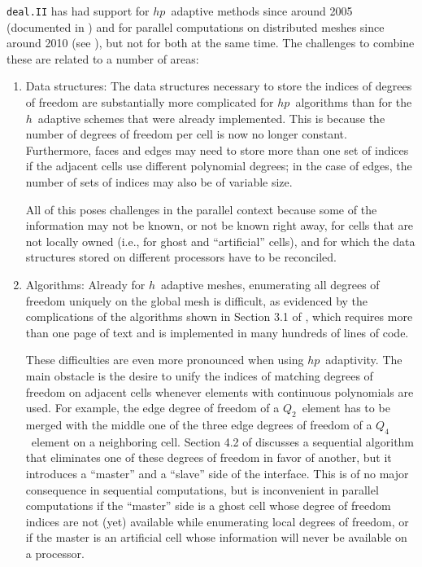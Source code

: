 \documentclass{ansarticle-preprint}
\newcommand{\specialword}[1]{\texttt{#1}}
\newcommand{\dealii}{{\specialword{deal.II}}\xspace}
\begin{document}
\dealii{} has had support for $hp$~adaptive methods since around 2005
(documented in \cite{BangerthKayserHerold2007}) and for parallel
computations on distributed meshes since around 2010 (see
\cite{BangerthBursteddeHeisterKronbichler11}), but not for both at the
same time. The challenges to combine these are related to a number of
areas:
\begin{enumerate}
\item Data structures: The data structures necessary to store the
  indices of degrees of freedom are substantially more
  complicated for $hp$~algorithms than for the $h$~adaptive schemes
  that were already implemented. This is because the number of degrees
  of freedom per cell is now no longer constant. Furthermore,
  faces and edges may need to store more than one set of indices if
  the adjacent cells use different polynomial degrees; in the case of
  edges, the number of sets of indices may also be of variable size.

  All of this poses challenges in the parallel context because some of
  the information may not be known, or not be known right away, for
  cells that are not locally owned (i.e., for ghost and ``artificial''
  cells), and for which the data structures stored on different
  processors have to be reconciled.

\item Algorithms: Already for $h$~adaptive meshes, enumerating all
  degrees of freedom uniquely on the global mesh is difficult, as evidenced by
  the complications of the algorithms shown in Section 3.1 of
  \cite{BangerthBursteddeHeisterKronbichler11}, which requires more
  than one page of text and is implemented in many hundreds of lines of
  code.

  These difficulties are even more pronounced when using $hp$~adaptivity.
  The main obstacle is the desire to unify the indices of
  matching degrees of freedom on adjacent cells whenever elements with
  continuous polynomials are used. For example, the edge degree of freedom
  of a $Q_2$~element has to be merged with the middle one of the three
  edge degrees of freedom of a $Q_4$~element on a neighboring cell.
  Section 4.2 of \cite{BangerthKayserHerold2007} discusses a sequential algorithm
  that eliminates one of these degrees of freedom in favor of another,
  but it introduces a ``master'' and a ``slave'' side of the
  interface. This is of no major consequence in sequential
  computations, but is inconvenient in parallel computations if the
  ``master'' side is a ghost cell whose degree of freedom indices are
  not (yet) available while enumerating local degrees of freedom, or
  if the master is an artificial cell whose information will never be
  available on a processor.


\end{enumerate}
\end{document}
